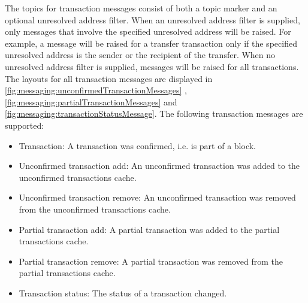 The topics for transaction messages consist of both a topic marker and an optional unresolved address filter.
When an unresolved address filter is supplied, only messages that involve the specified unresolved address will be raised.
For example, a message will be raised for a transfer transaction only if the specified unresolved address is the sender or the recipient of the transfer.
When no unresolved address filter is supplied, messages will be raised for all transactions.
The layouts for all transaction messages are displayed in \autoref{fig:messaging:unconfirmedTransactionMessages} , \autoref{fig:messaging:partialTransactionMessages} and \autoref{fig:messaging:transactionStatusMessage}.
The following transaction messages are supported:

\begin{itemize}
	\item{Transaction: A transaction was confirmed, i.e. is part of a block.}
	\item{Unconfirmed transaction add: An unconfirmed transaction was added to the unconfirmed transactions cache.}
	\item{Unconfirmed transaction remove: An unconfirmed transaction was removed from the unconfirmed transactions cache.}
	\item{Partial transaction add: A partial transaction was added to the partial transactions cache.}
	\item{Partial transaction remove: A partial transaction was removed from the partial transactions cache.}
	\item{Transaction status: The status of a transaction changed.}
\end{itemize}

\begin{figure}[H]
\end{figure}

